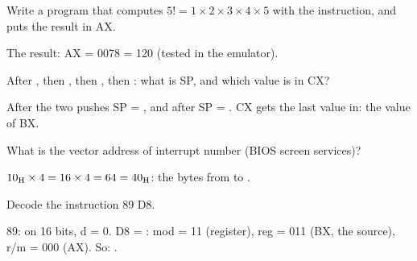\begin{tamrin}
    Write a program that computes $5! = 1 \times 2 \times 3 \times 4 \times 5$ with the  instruction, and puts the result in AX.
\end{tamrin}
\begin{hall}
    The result: AX = 0078 = 120 (tested in the emulator).
\end{hall}

\begin{tamrin}
    After , then , then , then : what is SP, and which value is in CX?
\end{tamrin}
\begin{hall}
    After the two pushes SP = , and after  SP = . CX gets the last value in: the value of BX.
\end{hall}

\begin{tamrin}
    What is the vector address of interrupt number  (BIOS screen services)?
\end{tamrin}
\begin{hall}
    $\mbox{10\textsubscript{H}} \times 4 = 16 \times 4 = 64 = \mbox{40\textsubscript{H}}$: the bytes from  to .
\end{hall}

\begin{tamrin}
    Decode the instruction 89 D8.
\end{tamrin}
\begin{hall}
    89:  on 16 bits, d = 0. D8 = : mod = 11 (register), reg = 011 (BX, the source),
    r/m = 000 (AX). So: .
\end{hall}
